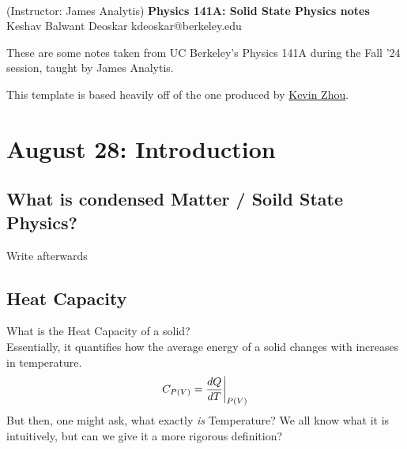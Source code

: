 \documentclass[11pt]{article}
\begin{document}
\thispagestyle{empty}
\bigskip \
\vspace{0.1cm}

\begin{center}
{\fontsize{22}{22} \selectfont (Instructor: James Analytis)}
\vskip 16pt
{\fontsize{36}{36} \selectfont \bf \sffamily Physics 141A: Solid State Physics notes}
\vskip 24pt
{\fontsize{18}{18} \selectfont \rmfamily Keshav Balwant Deoskar} 
\vskip 6pt
{\fontsize{14}{14} \selectfont \ttfamily kdeoskar@berkeley.edu} 
\vskip 24pt
\end{center}



These are some notes taken from UC Berkeley's Physics 141A during the Fall '24 session, taught by James Analytis.

\vskip 0.5cm
This template is based heavily off of the one produced by \href{https://knzhou.github.io/}{Kevin Zhou}.

\tableofcontents 

\pagebreak
\section{August 28: Introduction}

\subsection{What is condensed Matter / Soild State Physics?}
\begin{note}
  {Write afterwards}
\end{note}

\subsection{Heat Capacity}
What is the Heat Capacity of a solid?
\\
Essentially, it quantifies how the average energy of a solid changes with increases in temperature.
\[ C_{P(V)} = \restr{\frac{dQ}{dT}}{P(V)} \] But then, one might ask, what exactly \emph{is} Temperature? We all know what it is intuitively, but can we give it a more rigorous definition?
\\
\end{document}
